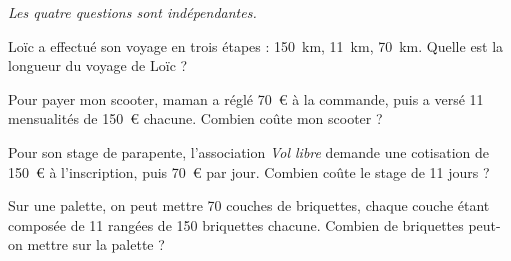 {\em Les quatre questions sont indépendantes.}
\begin{myenumerate}
\item Loïc a effectué son voyage en trois étapes : 150~km, 11~km,
70~km. Quelle est la longueur du voyage de Loïc ?
\item Pour payer mon scooter, maman a réglé 70~\textgreek{\euro} à la
commande, puis a versé 11 mensualités de 150~\textgreek{\euro}
chacune. Combien coûte mon scooter ?
\item Pour son stage de parapente, l'association {\em Vol libre}
demande une cotisation de 150~\textgreek{\euro} à l'inscription, puis
70~\textgreek{\euro} par jour. Combien coûte le stage de 11 jours ?
\item Sur une palette, on peut mettre 70 couches de briquettes, chaque
couche étant composée de 11 rangées de 150 briquettes chacune. Combien
de briquettes peut-on mettre sur la palette ?
\end{myenumerate}